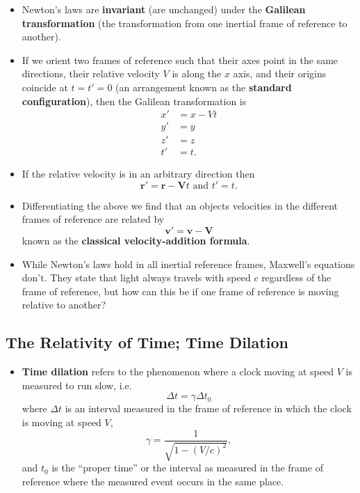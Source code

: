 \documentclass{article}
\renewcommand{\vec}[1]{\boldsymbol{\mathbf{#1}}}
\begin{document}
\begin{itemize}
  \item Newton's laws are \textbf{invariant} (are unchanged) under the \textbf{Galilean transformation} (the transformation from one inertial frame of reference to another).

  \item If we orient two frames of reference such that their axes point in the same directions, their relative velocity $V$ is along the $x$ axis, and their origins coincide at $t = t' = 0$ (an arrangement known as the \textbf{standard configuration}), then the Galilean transformation is \begin{align*}
          x' & = x - V t \\
          y' & = y       \\
          z' & = z       \\
          t' & = t.
        \end{align*}

  \item If the relative velocity is in an arbitrary direction then \[\vec{r}' = \vec{r} - \vec{V} t \text{ and } t' = t.\]

  \item Differentiating the above we find that an objects velocities in the different frames of reference are related by \[\vec{v}' = \vec{v} - \vec{V}\] known as the \textbf{classical velocity-addition formula}.

  \item While Newton's laws hold in all inertial reference frames, Maxwell's equations don't. They state that light always travels with speed $c$ regardless of the frame of reference, but how can this be if one frame of reference is moving relative to another?
\end{itemize}

\setcounter{subsection}{3}
\subsection{The Relativity of Time; Time Dilation}

\begin{itemize}
  \item \textbf{Time dilation} refers to the phenomenon where a clock moving at speed $V$ is measured to run slow, i.e. \[\Delta t = \gamma \Delta t_0\] where $\Delta t$ is an interval measured in the frame of reference in which the clock is moving at speed $V$, \[\gamma = \frac{1}{\sqrt{1 - (V / c)^2}},\] and $t_0$ is the ``proper time'' or the interval as measured in the frame of reference where the measured event occurs in the same place.
\end{itemize}
\end{document}
